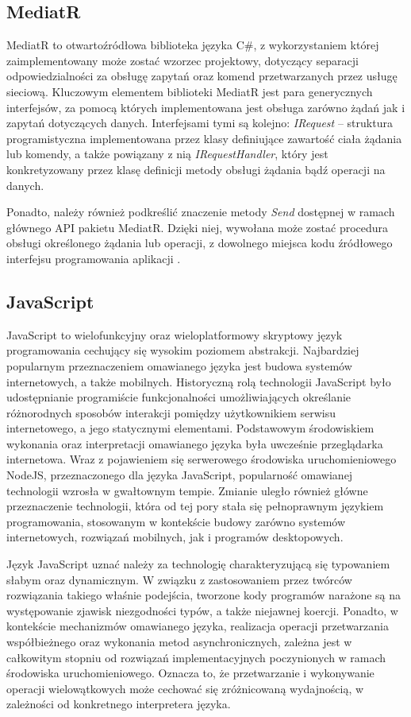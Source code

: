 \subsection*{MediatR}
MediatR to otwartoźródłowa biblioteka języka C\#, z wykorzystaniem której zaimplementowany może zostać wzorzec projektowy, dotyczący separacji odpowiedzialności za obsługę zapytań oraz komend przetwarzanych przez usługę sieciową. Kluczowym elementem biblioteki MediatR jest para generycznych interfejsów, za pomocą których implementowana jest obsługa zarówno żądań jak i zapytań dotyczących danych. Interfejsami tymi są kolejno: \textit{IRequest} -- struktura programistyczna implementowana przez klasy definiujące zawartość ciała żądania lub komendy, a także powiązany z nią \textit{IRequestHandler}, który jest konkretyzowany przez klasę definicji metody obsługi żądania bądź operacji na danych. 

Ponadto, należy również podkreślić znaczenie metody \textit{Send} dostępnej w ramach głównego API pakietu MediatR. Dzięki niej, wywołana może zostać procedura obsługi określonego żądania lub operacji, z dowolnego miejsca kodu źródłowego interfejsu programowania aplikacji \cite{mediatr}.
\subsection*{JavaScript}
JavaScript to wielofunkcyjny oraz wieloplatformowy skryptowy język programowania cechujący się wysokim poziomem abstrakcji. Najbardziej popularnym przeznaczeniem omawianego języka jest budowa systemów internetowych, a także mobilnych. Historyczną rolą technologii JavaScript było udostępnianie programiście funkcjonalności umożliwiających określanie różnorodnych sposobów interakcji pomiędzy użytkownikiem serwisu internetowego, a jego statycznymi elementami. Podstawowym środowiskiem wykonania oraz interpretacji omawianego języka była uwcześnie przeglądarka internetowa. Wraz z pojawieniem się serwerowego środowiska uruchomieniowego NodeJS, przeznaczonego dla języka JavaScript, popularność omawianej technologii wzrosła w gwałtownym tempie. Zmianie uległo również główne przeznaczenie technologii, która od tej pory stała się pełnoprawnym językiem programowania, stosowanym w kontekście budowy zarówno systemów internetowych, rozwiązań mobilnych, jak i programów desktopowych.

Język JavaScript uznać należy za technologię charakteryzującą się typowaniem słabym oraz dynamicznym. W związku z zastosowaniem przez twórców rozwiązania takiego właśnie podejścia, tworzone kody programów narażone są na występowanie zjawisk niezgodności typów, a także niejawnej koercji. Ponadto, w kontekście mechanizmów omawianego języka, realizacja operacji przetwarzania współbieżnego oraz wykonania metod asynchronicznych, zależna jest w całkowitym stopniu od rozwiązań implementacyjnych poczynionych w ramach środowiska uruchomieniowego. Oznacza to, że przetwarzanie i wykonywanie operacji wielowątkowych może cechować się zróżnicowaną wydajnością, w zależności od konkretnego interpretera języka.  

